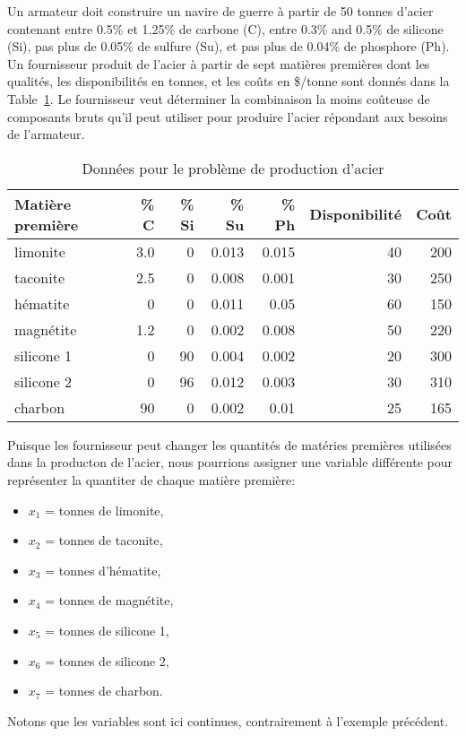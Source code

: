 \begin{example}

Un armateur doit construire un navire de guerre à partir de 50 tonnes d'acier contenant entre 0.5\% et 1.25\% de carbone (C), entre 0.3\% and 0.5\% de silicone (Si), pas plus de 0.05\% de sulfure (Su), et pas plus de 0.04\% de phosphore (Ph).
Un fournisseur produit de l'acier à partir de sept matières premières dont les qualités, les disponibilités en tonnes, et les coûts en \$/tonne sont donnés dans la Table~\ref{tab:steeldata}.
Le fournisseur veut déterminer la combinaison la moins coûteuse de composants bruts qu'il peut utiliser pour produire l'acier répondant aux besoins de l'armateur.
\begin{table}[htb]
\begin{center}
\begin{tabular}{lrrrrrr}
Matière première & \% C & \% Si & \% Su & \% Ph & Disponibilité & Coût \\
\hline
limonite & 3.0 & 0 & 0.013 & 0.015 & 40 & 200 \\
taconite & 2.5 & 0 & 0.008 & 0.001 & 30 & 250 \\
hématite & 0 & 0 & 0.011 & 0.05 & 60 & 150 \\
magnétite & 1.2 & 0 & 0.002 & 0.008 & 50 & 220 \\
silicone 1 & 0 & 90 & 0.004 & 0.002 & 20 & 300 \\
silicone 2 & 0 & 96 & 0.012 & 0.003 & 30 & 310 \\
charbon & 90 & 0 & 0.002 & 0.01 & 25 & 165 \\
\hline
\end{tabular}
\label{tab:steeldata}
\caption{Données pour le problème de production d'acier}
\end{center}
\end{table}

Puisque les fournisseur peut changer les quantités de matéries premières utilisées dans la producton de l'acier, nous pourrions assigner une variable différente pour représenter la quantiter de chaque matière première:
\begin{itemize}
\item
$x_1$ = tonnes de limonite,
\item
$x_2$ = tonnes de taconite,
\item
$x_3$ = tonnes d'hématite,
\item
$x_4$ = tonnes de magnétite,
\item
$x_5$ = tonnes de silicone 1,
\item
$x_6$ = tonnes de silicone 2,
\item
$x_7$ = tonnes de charbon.
\end{itemize}
Notons que les variables sont ici continues, contrairement à l'exemple précédent.


\end{example}
